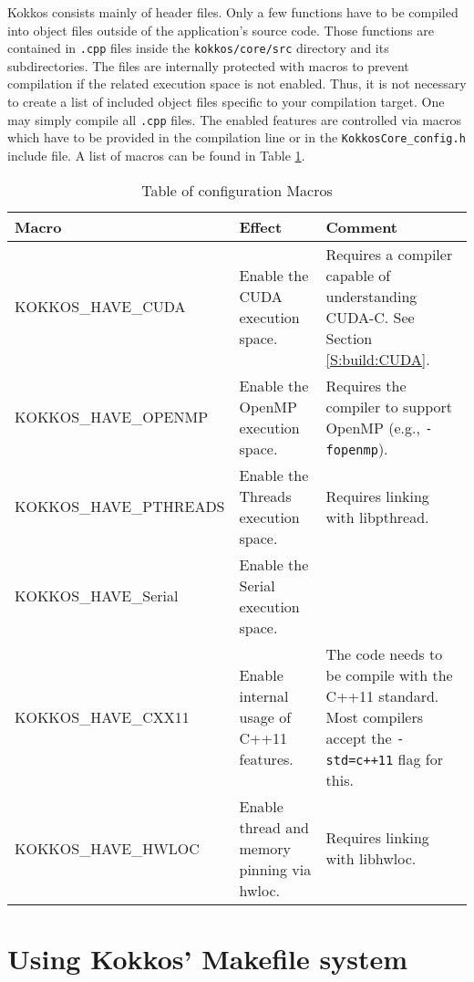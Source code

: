Kokkos consists mainly of header files. 
Only a few functions have to be compiled into object files outside of the application's source code.
Those functions are contained in \verb!.cpp! files inside the \lstinline|kokkos/core/src| directory and its subdirectories.
The files are internally protected with macros to prevent compilation if the related execution space is not enabled. 
Thus, it is not necessary to create a list of included object files specific to your compilation target.
One may simply compile all \verb!.cpp! files. 
The enabled features are controlled via macros which have to be provided in the compilation line or in the \lstinline|KokkosCore_config.h| include file. 
A list of macros can be found in Table \ref{TBL:CompileMacros}.
\begin{table}
\caption{Table of configuration Macros}
\label{TBL:CompileMacros}
\begin{small}
\begin{tabular}[t]{p{}p{}p{}}
\hline\hline
Macro & Effect & Comment \\
\hline
{\tiny KOKKOS\_HAVE\_CUDA} & Enable the CUDA execution space. & Requires a compiler capable of understanding CUDA-C. See Section \ref{S:build:CUDA}. \\
{\tiny KOKKOS\_HAVE\_OPENMP} & Enable the OpenMP execution space. & Requires the compiler to support OpenMP (e.g., \verb!-fopenmp!). \\
{\tiny KOKKOS\_HAVE\_PTHREADS} & Enable the Threads execution space. & Requires linking with libpthread.\\
{\tiny KOKKOS\_HAVE\_Serial} & Enable the Serial execution space. & \\
{\tiny KOKKOS\_HAVE\_CXX11} & Enable internal usage of C++11 features. & The code needs to be compile with the C++11 standard. Most compilers accept the \verb!-std=c++11! flag for this.\\
{\tiny KOKKOS\_HAVE\_HWLOC} & Enable thread and memory pinning via hwloc. & Requires linking with libhwloc.\\
\hline\hline
\end{tabular}
\end{small}
\end{table}

\section{Using Kokkos' Makefile system}\label{S:build:make}

